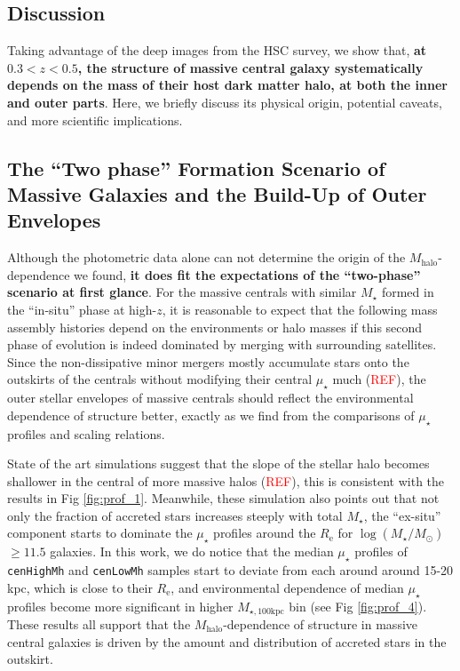 \documentclass{emulateapj}
\def\rbcg{\texttt{cenHighMh}}
\def\nbcg{\texttt{cenLowMh}}
\def\mstar{{$M_{\star}$}}
\def\mhalo{{$M_{\mathrm{halo}}$}}
\def\logms{{$\log (M_{\star}/M_{\odot})$}}
\def\mtot{{$M_{\star,100\mathrm{kpc}}$}}
\def\mden{{$\mu_{\star}$}}
\newcommand{\addref}{{\textcolor{red}{REF}}}
\begin{document}
\begin{CJK*}{UTF8}{gbsn}
\section{Discussion}
    \label{sec:discussion}
    
    Taking advantage of the deep images from the HSC survey, we show that,
    \textbf{at $0.3 < z < 0.5$, the structure of massive central galaxy systematically 
    depends on the mass of their host dark matter halo, at both the inner and outer
    parts}. 
    Here, we briefly discuss its physical origin, potential caveats, and more scientific 
    implications. 
    
    
\subsection{The ``Two phase'' Formation Scenario of Massive Galaxies and the 
            Build-Up of Outer Envelopes}
    
    Although the photometric data alone can not determine the origin of the 
    \mhalo{}-dependence we found, \textbf{it does fit the expectations of the 
    ``two-phase'' scenario at first glance}. 
    For the massive centrals with similar \mstar{} formed in the ``in-situ'' phase at 
    high-$z$, it is reasonable to expect that the following mass assembly histories 
    depend on the environments or halo masses if this second phase of evolution is 
    indeed dominated by merging with surrounding satellites. 
    Since the non-dissipative minor mergers mostly accumulate stars onto the 
    outskirts of the centrals without modifying their central \mden{} much
    (\addref{}), the outer stellar envelopes of massive centrals should reflect the 
    environmental dependence of structure better, exactly as we find from the 
    comparisons of \mden{} profiles and scaling relations. 
       
    State of the art simulations suggest that the slope of the stellar halo becomes 
    shallower in the central of more massive halos (\addref{}), this is consistent 
    with the results in Fig \ref{fig:prof_1}. 
    Meanwhile, these simulation also points out that not only the fraction of 
    accreted stars increases steeply with total \mstar{}, the ``ex-situ'' component
    starts to dominate the \mden{} profiles around the $R_{\mathrm{e}}$ for 
    \logms{}$\geq 11.5$ galaxies.
    In this work, we do notice that the median \mden{} profiles of \rbcg{} and \nbcg{} 
    samples start to deviate from each around around 15-20 kpc, which is close to 
    their $R_{\mathrm{e}}$, and environmental dependence of median \mden{} profiles 
    become more significant in higher \mtot{} bin (see Fig \ref{fig:prof_4}). 
    These results all support that the \mhalo{}-dependence of structure in massive 
    central galaxies is driven by the amount and distribution of accreted stars 
    in the outskirt. 
        

\end{CJK*}
\end{document}
